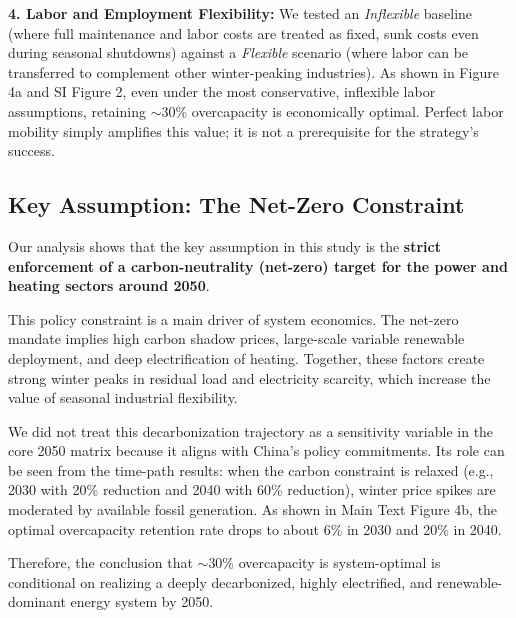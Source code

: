 \documentclass[preprint,12pt]{elsarticle}
\begin{document}
\vspace{0.3cm}
\noindent\textbf{4. Labor and Employment Flexibility:} We tested an \textit{Inflexible} baseline (where full maintenance and labor costs are treated as fixed, sunk costs even during seasonal shutdowns) against a \textit{Flexible} scenario (where labor can be transferred to complement other winter-peaking industries). As shown in Figure 4a and SI Figure 2, even under the most conservative, inflexible labor assumptions, retaining $\sim$30\% overcapacity is economically optimal. Perfect labor mobility simply amplifies this value; it is not a prerequisite for the strategy's success.

\subsection{Key Assumption: The Net-Zero Constraint}
Our analysis shows that the key assumption in this study is the \textbf{strict enforcement of a carbon-neutrality (net-zero) target for the power and heating sectors around 2050}.

This policy constraint is a main driver of system economics. The net-zero mandate implies high carbon shadow prices, large-scale variable renewable deployment, and deep electrification of heating. Together, these factors create strong winter peaks in residual load and electricity scarcity, which increase the value of seasonal industrial flexibility.

We did not treat this decarbonization trajectory as a sensitivity variable in the core 2050 matrix because it aligns with China's policy commitments. Its role can be seen from the time-path results: when the carbon constraint is relaxed (e.g., 2030 with 20\% reduction and 2040 with 60\% reduction), winter price spikes are moderated by available fossil generation. As shown in Main Text Figure 4b, the optimal overcapacity retention rate drops to about 6\% in 2030 and 20\% in 2040.

Therefore, the conclusion that $\sim$30\% overcapacity is system-optimal is conditional on realizing a deeply decarbonized, highly electrified, and renewable-dominant energy system by 2050.















\end{document}
